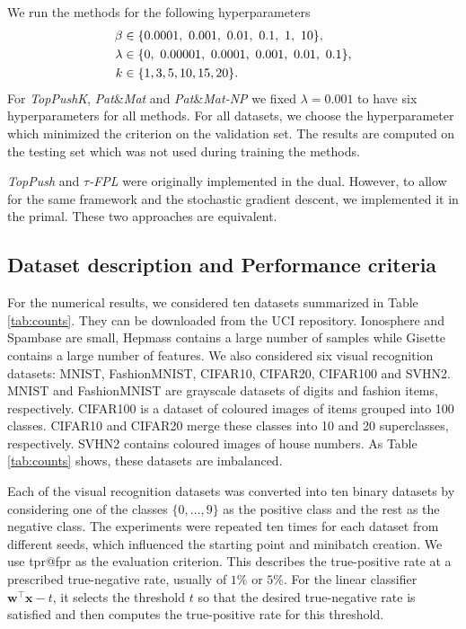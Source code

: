 \documentclass[]{interact}
\theoremstyle{plain}%
\theoremstyle{definition}
\theoremstyle{remark}
\let\originalleft\left
\let\originalright\right
\renewcommand{\left}{\mathopen{}\mathclose\bgroup\originalleft}
\renewcommand{\right}{\aftergroup\egroup\originalright}
\newcommand{\toppush}{\emph{TopPush}\xspace}
\newcommand{\toppushk}{\emph{TopPushK}\xspace}
\newcommand{\patmat}{\emph{Pat}\&\emph{Mat}\xspace}
\newcommand{\npB}{{\emph{Pat}\&\emph{Mat-NP}}\xspace}
\newcommand{\npC}{{\emph{$\tau$-FPL}}\xspace}
\newcommand{\NEW}[1]{{\color{blue} #1}}
\begin{document}
We run the methods for the following hyperparameters
\begin{equation}\label{eq:beta1}
\aligned
\beta &\in  \left\{0.0001,\ 0.001,\ 0.01,\ 0.1,\ 1,\ 10\right\}, \\
\lambda &\in \left\{0,\ 0.00001,\ 0.0001,\ 0.001,\ 0.01,\ 0.1\right\}, \\
k &\in \left\{1,3,5,10,15,20\right\}.
\endaligned
\end{equation}
For \toppushk, \patmat and \npB we fixed $\lambda=0.001$ to have six hyperparameters for all methods. For all datasets, we choose the hyperparameter which minimized the criterion on the validation set. The results are computed on the testing set which was not used during training the methods.

\toppush and \npC were originally implemented in the dual. However, to allow for the same framework and the stochastic gradient descent, we implemented it in the primal. These two approaches are equivalent.


\subsection{Dataset description and Performance criteria}\label{sec:datasets}

For the numerical results, we considered \NEW{ten} datasets summarized in Table \ref{tab:counts}. They can be downloaded from the UCI repository. Ionosphere \citep{ionosphere} and Spambase are small, Hepmass \citep{hepmass} contains a large number of samples while Gisette \citep{gisette} contains a large number of features. \NEW{We also considered six visual recognition datasets: MNIST, FashionMNIST, CIFAR10, CIFAR20, CIFAR100 and SVHN2. MNIST and FashionMNIST are grayscale datasets of digits and fashion items, respectively. CIFAR100 is a dataset of coloured images of items grouped into 100 classes. CIFAR10 and CIFAR20 merge these classes into 10 and 20 superclasses, respectively. SVHN2 contains coloured images of house numbers. As Table \ref{tab:counts} shows, these datasets are imbalanced.}

\NEW{Each of the visual recognition datasets was converted into ten binary datasets by considering one of the classes $\{0,\dots,9\}$ as the positive class and the rest as the negative class. The experiments were repeated ten times for each dataset from different seeds, which influenced the starting point and minibatch creation. We use tpr@fpr as the evaluation criterion. This describes the true-positive rate at a prescribed true-negative rate, usually of $1\%$ or $5\%$. For the linear classifier $\bm w^\top \bm x-t$, it selects the threshold $t$ so that the desired true-negative rate is satisfied and then computes the true-positive rate for this threshold.}
\end{document}
